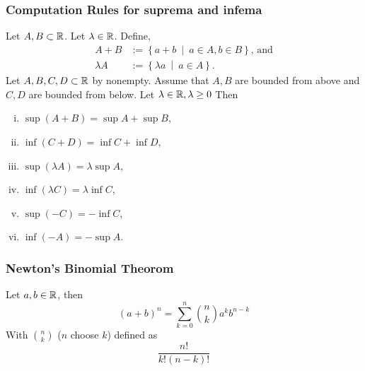 \subsubsection*{Computation Rules for suprema and infema}
Let $A, B \subset \mathbb{R}$. Let $\lambda \in \mathbb{R}$. Define,
\begin{align*}
    A + B &:= \left\{ a + b\ \middle|\ a \in A, b \in B \right\}\text{, and}\\
    \lambda A &:= \left\{ \lambda a\ \middle|\ a \in A \right\}.
\end{align*}
\uprop Let $A,B,C,D \subset \mathbb{R}$ by nonempty. Assume that $A,B$ are bounded from
above and $C,D$ are bounded from below. Let $\lambda \in \mathbb{R}, \lambda \geq 0$ Then
\begin{enumerate}[(i)]
    \item $\sup(A + B) = \sup A + \sup B$,
    \item $\inf(C + D) = \inf C + \inf D$,
    \item $\sup(\lambda A) = \lambda \sup A$,
    \item $\inf(\lambda C) = \lambda \inf C$,
    \item $\sup(-C) = - \inf C$,
    \item $\inf(-A) = - \sup A$.
\end{enumerate}


\subsubsection*{Newton's Binomial Theorom}
\uthm Let $a, b \in \mathbb{R}$, then
\[
    (a+b)^n = \sum_{k = 0}^{n} \binom{n}{k} a^k b^{n-k}
\]
With $\binom{n}{k}$ ($n$ choose $k$) defined as
\[
    \frac{n!}{k!(n-k)!}
\]